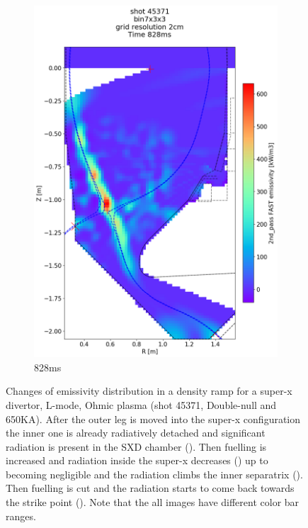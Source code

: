 \begin{figure}[!ht]
\begin{subfigure}{0.395\linewidth}
         \includegraphics[trim={75 40 0 190},clip,width=\textwidth]{Chapters/chapter2/figs/IRVB-MASTU_shot-45371_export_11.png}
         \vspace*{-6.5mm}
         \caption{828ms}
         \label{fig:45371_export2_4}
     \end{subfigure}
    \vspace*{-3mm}
    \caption{Changes of emissivity distribution in a density ramp for a super-x divertor, L-mode, Ohmic plasma (shot 45371, Double-null and 650KA). After the outer leg is moved into the super-x configuration the inner one is already radiatively detached and significant radiation is present in the SXD chamber (). Then fuelling is increased and radiation inside the super-x decreases () up to becoming negligible and the radiation climbs the inner separatrix (). Then fuelling is cut and the radiation starts to come back towards the strike point (). Note that the all images have different color bar ranges.}
    \label{fig:45371_export2}
\end{figure}

